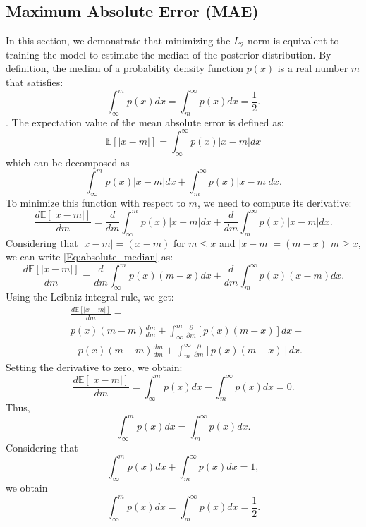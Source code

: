 \documentclass{aa}
\begin{document}
\begin{appendix}
\section{Maximum Absolute Error (MAE)}\label{Sec:appendix_Maximum Absolute Error}
In this section, we demonstrate that minimizing the $L_2$ norm is equivalent to training the model to estimate the median of the posterior distribution.
By definition, the median of a probability density function $p(x)$ is a real number $m$ that satisfies:
\begin{equation}\label{Eq:definition_median}
\int_{\infty}^{m} p(x)dx=\int_{m}^{\infty}p(x)dx=\frac{1}{2}.
\end{equation}. 
The expectation value of the mean absolute error is defined as:
\begin{equation}
    \mathbb{E}[|x-m|]= \int_{\infty}^{\infty}p(x)|x-m|dx  
\end{equation}
which can be decomposed as
\begin{equation}
        \int_{\infty}^{m}p(x)|x-m|dx +\int_{m}^{\infty}p(x)|x-m|dx .
\end{equation}
To minimize this function with respect to $m$, we need to compute its derivative:
\begin{equation}\label{Eq:absolute_median}
    \frac{d\mathbb{E}[|x-m|]}{dm}=
    \frac{d}{dm}\int_{\infty}^{m}p(x)|x-m|dx +\frac{d}{dm}\int_{m}^{\infty}p(x)|x-m|dx. 
\end{equation}
Considering that $|x-m|=(x-m)$ for $m\le x$ and $|x-m|=(m-x)$ $m\ge x$, 
we can write \autoref{Eq:absolute_median} as:
\begin{equation}
    \frac{d\mathbb{E}[|x-m|]}{dm}=
    \frac{d}{dm}\int_{\infty}^{m}p(x)(m-x)dx +\frac{d}{dm}\int_{m}^{\infty}p(x)(x-m)dx .
\end{equation}
Using the Leibniz integral rule, we get:
\begin{align}
    &\frac{d\mathbb{E}[|x-m|]}{dm}= \\
    &
    p(x)(m-m)\frac{dm}{dm}+\int_{\infty}^{m}\frac{\partial}{\partial m}[p(x)(m-x)]dx + \nonumber \\
    & - p(x)(m-m)\frac{dm}{dm}+\int_{m}^{\infty}\frac{\partial}{\partial m}[p(x)(m-x)]dx \nonumber .
\end{align}
Setting the derivative to zero, we obtain:
\begin{equation}
    \frac{d\mathbb{E}[|x-m|]}{dm}= \int_{\infty}^{m} p(x)dx-\int_{m}^{\infty}p(x)dx =0.
\end{equation}
Thus,
\begin{equation}
\int_{\infty}^{m} p(x)dx=\int_{m}^{\infty}p(x)dx .
\end{equation}
Considering that
\begin{equation}
\int_{\infty}^{m} p(x)dx+\int_{m}^{\infty}p(x)dx=1,
\end{equation}
we obtain 
\begin{equation}\label{Eq:definition_median}
\int_{\infty}^{m} p(x)dx=\int_{m}^{\infty}p(x)dx=\frac{1}{2}.
\end{equation}
\end{appendix}
\end{document}
